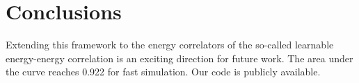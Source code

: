 \section{Conclusions}\label{sec:conclusions}

Extending this framework to the energy correlators of the so-called
learnable energy-energy correlation is an exciting direction for future
work. The area under the curve reaches 0.922 for fast simulation. Our
code is publicly available.

